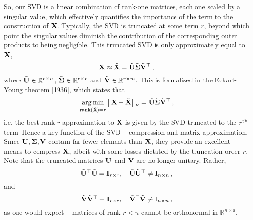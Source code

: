 So, our SVD is a linear combination of rank-one matrices, each one scaled
by a singular value, which effectively quantifies the importance of the
term to the construction of $\mathbf{X}$. Typically, the SVD is truncated
at some term $r$, beyond which point the singular values diminish the
contribution of the corresponding outer products to being negligible.
This truncated SVD is only approximately equal to $\mathbf{X}$,
%
\begin{displaymath}
  \mathbf{X} \approx \tilde{\mathbf{X}}
  = \tilde{\mathbf{U}}\tilde{\mathbf{\Sigma}}\tilde{\mathbf{V}}^\top \,,
\end{displaymath}
%
where $\tilde{\mathbf{U}}\in\mathbb{R}^{r\times n}$,
$\tilde{\mathbf{\Sigma}}\in\mathbb{R}^{r\times r}$ and
$\tilde{\mathbf{V}}\in\mathbb{R}^{r\times m}$. This is formalised in the
Eckart-Young theorem [1936], which states that
%
\begin{equation}
  \operatorname*{arg\,min}_{\mathrm{rank}(\tilde{\mathbf{X}}) = r}
  \left\lVert\mathbf{X} - \tilde{\mathbf{X}}\right\rVert_F
  = \tilde{\mathbf{U}}\tilde{\mathbf{\Sigma}}\tilde{\mathbf{V}}^\top \,,
\end{equation}
%
i.e. the best rank-$r$ approximation to $\mathbf{X}$ is given by the
SVD truncated to the $r^\mathrm{th}\mkern1mu$ term. Hence a key function of the SVD --
compression and matrix approximation. Since
$\tilde{\mathbf{U}}, \tilde{\mathbf{\Sigma}}, \tilde{\mathbf{V}}$ contain
far fewer elements than $\mathbf{X}$, they provide an excellent means to
compress $\mathbf{X}$, albeit with some losses dictated by the truncation
order $r$. Note that the truncated matrices
$\tilde{\mathbf{U}}$ and $\tilde{\mathbf{V}}$ are no longer unitary. Rather,
%
\begin{displaymath}
  \tilde{\mathbf{U}}^\top\tilde{\mathbf{U}} = \mathbf{I}_{r\times r},\quad
  \tilde{\mathbf{U}}\tilde{\mathbf{U}}^\top \neq \mathbf{I}_{n\times n} \,,
\end{displaymath}
%
and
%
\begin{displaymath}
  \tilde{\mathbf{V}}\tilde{\mathbf{V}}^\top = \mathbf{I}_{r\times r},\quad
  \tilde{\mathbf{V}}^\top\tilde{\mathbf{V}} \neq \mathbf{I}_{n\times n} \,,
\end{displaymath}
%
as one would expect -- matrices of rank $r < n$ cannot be orthonormal
in $\mathbb{R}^{n\times n}$.\\

